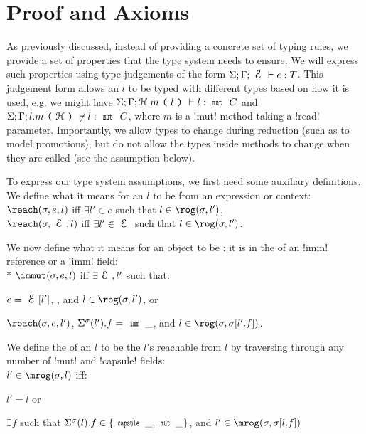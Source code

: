 \section{Proof and Axioms}
\label{s:proof}

As previously discussed, instead of providing a concrete set of typing rules, we provide a set of properties that the type system needs to ensure.
We will express such properties using type judgements of the form $\ty{e}{T}$. This judgement form allows an $l$ to be typed with different types based on how it is used, e.g. we might have $\S;\G;\h.m\oR l \cR \vdash l : \Kw{mut}\ C$  and $\S;\G;l.m\oR \h \cR \nvdash l : \Kw{mut}\ C$, where $m$ is a \Q!mut! method taking a \Q!read! parameter. Importantly, we allow types to change during reduction (such as to model promotions), but do not allow the types inside methods to change when they are called (see the  assumption below).

To express our type system assumptions, we first need some auxiliary definitions. We define what it means for an $l$ to be \reach from an expression or context:\\
\indent $\reach(\s, e, l)$ iff $\exists l' \in e$ such that $l \in \rog(\s, l')$,\\
\indent $\reach(\s, \E, l)$ iff $\exists l' \in \E$ such that $l \in \rog(\s, l')$.

\noindent We now define what it means for an object to be \immut: it is in the \rog of an \Q!imm! reference or a \reach \Q!imm! field:\\*
\indent $\immut(\s, e, l)$ iff $\exists \E, l'$ such that:
\begin{iitemize}
\item $e = \E[l']$, , and $l \in \rog(\s, l')$, or
\item $\reach(\s, e, l')$, $\Ss(l').f = \Kw{imm}\,\_$, and $l \in \rog(\s, \s[l'.f])$.
\end{iitemize}

\noindent We define the \mrog of an $l$ to be the $l'$s reachable from $l$ by traversing through any number of \Q!mut! and \Q!capsule! fields:\\
\indent $l' \in \mrog(\s, l)$ iff:%
\begin{iitemize}
	\item $l' = l$ or
	\item $\exists f$ such that $\Ss(l).f \in \{\Kw{capsule}\,\_, \Kw{mut}\,\_\}$, and $l' \in \mrog(\s, \s[l.f])$
\end{iitemize}

